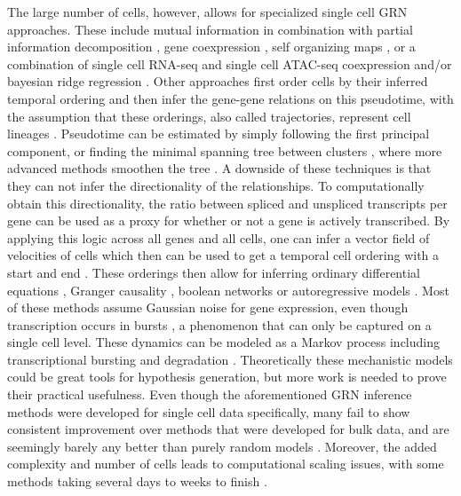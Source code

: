 The large number of cells, however, allows for specialized single cell GRN approaches. These include mutual information in combination with partial information decomposition \cite{Chan_2017}, gene coexpression \cite{Aibar_2017}, self organizing maps \cite{Jansen_2019}, or a combination of single cell RNA-seq and single cell ATAC-seq coexpression and/or bayesian ridge regression \cite{Gonz_lez_Blas_2022,Jiang_2021,Kamimoto_2020}. Other approaches first order cells by their inferred temporal ordering and then infer the gene-gene relations on this pseudotime, with the assumption that these orderings, also called trajectories, represent cell lineages \cite{Packer_2019}. Pseudotime can be estimated by simply following the first principal component, or finding the minimal spanning tree between clusters \cite{Wolf_2019}, where more advanced methods smoothen the tree \cite{Qiu_2017,Street_2018}. A downside of these techniques is that they can not infer the directionality of the relationships. To computationally obtain this directionality, the ratio between spliced and unspliced transcripts per gene can be used as a proxy for whether or not a gene is actively transcribed. By applying this logic across all genes and all cells, one can infer a vector field of velocities of cells which then can be used to get a temporal cell ordering with a start and end \cite{Bergen_2020,La_Manno_2018}. These orderings then allow for inferring ordinary differential equations \cite{Aubin_Frankowski_2020,Matsumoto_2017}, Granger causality \cite{Deshpande_2022,Papili_Gao_2017,Qiu_2020}, boolean networks \cite{Woodhouse_2018} or autoregressive models \cite{Sanchez_Castillo_2017}. Most of these methods assume Gaussian noise for gene expression, even though transcription occurs in bursts \cite{Chubb_2006,Larsson_2019}, a phenomenon that can only be captured on a single cell level. These dynamics can be modeled as a Markov process including transcriptional bursting and degradation \cite{Ventre_2022}. Theoretically these mechanistic models could be great tools for hypothesis generation, but more work is needed to prove their practical usefulness. Even though the aforementioned GRN inference methods were developed for single cell data specifically, many fail to show consistent improvement over methods that were developed for bulk data, and are seemingly barely any better than purely random models \cite{McCalla_2021,Chen_2018,Pratapa_2020}. Moreover, the added complexity and number of cells leads to computational scaling issues, with some methods taking several days to weeks to finish \cite{McCalla_2021}.

